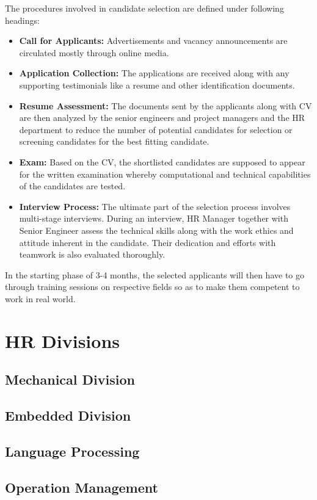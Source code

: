 \documentclass[12pt,a4paper]{scrreprt}
\begin{document}
The procedures involved in candidate selection are defined under following headings:
	\begin{itemize}
		\item \textbf{Call for Applicants:} Advertisements and vacancy announcements are circulated mostly through online media.
		\item \textbf{Application Collection:} The applications are received along with any supporting testimonials like a resume and other identification documents.
		\item \textbf{Resume Assessment:} The documents sent by the applicants along with CV are then analyzed by the senior engineers and project managers and the HR department to reduce the number of potential candidates for selection or screening candidates for the best fitting candidate.
		\item \textbf{Exam:} Based on the CV, the shortlisted candidates are supposed to appear for the written examination whereby computational and technical capabilities of the
candidates are tested.
		\item \textbf{Interview Process:} The ultimate part of the selection process involves multi-stage interviews. During an interview, HR Manager together with Senior Engineer assess
the technical skills along with the work ethics and attitude inherent in the candidate. Their dedication and efforts with teamwork is also evaluated thoroughly.
	\end{itemize}

In the starting phase of 3-4 months, the selected applicants will then have to go through
training sessions on respective fields so as to make them competent to work in real world.
\section{HR Divisions}
\subsection{Mechanical Division}
\subsection{Embedded Division}
\subsection{Language Processing}
\subsection{Operation Management}
\end{document}
